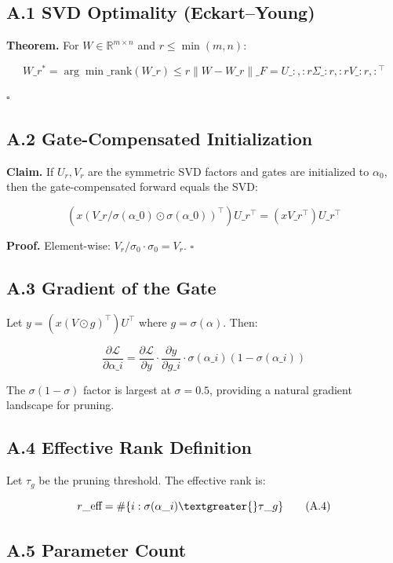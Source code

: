 \subsection{A.1 SVD Optimality (Eckart--Young)}

\textbf{Theorem.} For $W \in \mathbb{R}^{m \times n}$ and $r \leq \min(m, n)$:

\[
W\_r^* = \arg\min\_{\text{rank}(W\_r) \leq r} \|W - W\_r\|\_F = U\_{:, :r} \Sigma\_{:r, :r} V\_{:r, :}^\top
\tag{A.1}
\]

$\square$

\subsection{A.2 Gate-Compensated Initialization}

\textbf{Claim.} If $U_r, V_r$ are the symmetric SVD factors and gates are 
initialized to $\alpha_0$, then the gate-compensated forward equals the SVD:

\[
(x (V\_r / \sigma(\alpha\_0) \odot \sigma(\alpha\_0))^\top) U\_r^\top = (x V\_r^\top) U\_r^\top
\tag{A.2}
\]

\textbf{Proof.} Element-wise: $V_r / \sigma_0 \cdot \sigma_0 = V_r$. $\square$

\subsection{A.3 Gradient of the Gate}

Let $y = (x (V \odot g)^\top) U^\top$ where $g = \sigma(\alpha)$. Then:

\[
\frac{\partial \mathcal{L}}{\partial \alpha\_i}
= \frac{\partial \mathcal{L}}{\partial y} \cdot \frac{\partial y}{\partial g\_i} \cdot \sigma(\alpha\_i)(1 - \sigma(\alpha\_i))
\tag{A.3}
\]

The $\sigma(1-\sigma)$ factor is largest at $\sigma = 0.5$, providing a 
natural gradient landscape for pruning.

\subsection{A.4 Effective Rank Definition}

Let $\tau_g$ be the pruning threshold. The effective rank is:

\[
r\_\text{eff} = \#\{i : \sigma(\alpha\_i) \textgreater{} \tau\_g\}
\tag{A.4}
\]

\subsection{A.5 Parameter Count}

